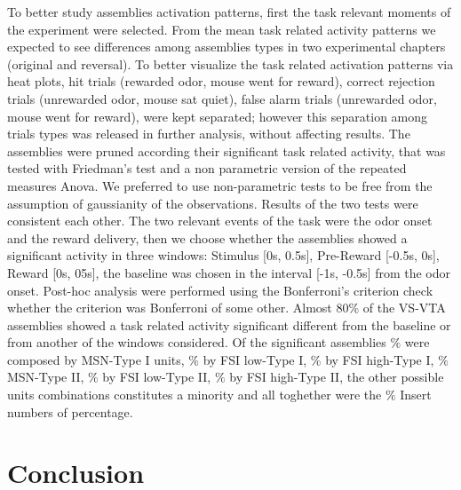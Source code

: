 To better study assemblies activation patterns, first the task relevant moments of the experiment were selected. From the mean task related activity patterns we expected to see differences among assemblies types in two experimental chapters (original and reversal). To better visualize the task related activation patterns via heat plots, hit trials (rewarded odor, mouse went for reward), correct rejection trials (unrewarded odor, mouse sat quiet), false alarm trials (unrewarded odor, mouse went for reward), were kept separated; however this separation among trials types was released in further analysis, without affecting results.
The assemblies were pruned according their significant task related activity, that was tested with Friedman's test and a non parametric version of the repeated measures Anova. We preferred to use non-parametric tests to be free from the assumption of gaussianity of the observations. Results of the two tests were consistent each other. The two relevant events of the task were the odor onset and the reward delivery, then we choose whether the assemblies showed a significant activity in three windows: Stimulus [0s, 0.5s], Pre-Reward [-0.5s, 0s], Reward [0s, 05s], the baseline was chosen in the interval [-1s, -0.5s] from the odor onset. Post-hoc analysis were performed using the Bonferroni's criterion {\color{red}check whether the criterion was Bonferroni of some other}. Almost $80\%$ of the VS-VTA assemblies showed a task related activity significant different from the baseline or from another of the windows considered. Of the significant assemblies $\%$ were composed by MSN-Type I units, $\%$ by FSI low-Type I, $\%$ by FSI high-Type I, $\%$ MSN-Type II, $\%$ by FSI low-Type II, $\%$ by FSI high-Type II, the other possible units combinations constitutes a minority and all toghether were the $\%$ {\color{red} Insert numbers of percentage}.

\section{Conclusion}
